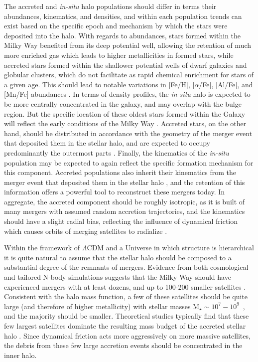 The accreted and \textit{in-situ} halo populations should differ in terms their abundances, kinematics, and densities, and within each population trends can exist based on the specific epoch and mechanism by which the stars were deposited into the halo. With regards to abundances, stars formed within the Milky Way benefited from its deep potential well, allowing the retention of much more enriched gas which leads to higher metallicities in formed stars, while accreted stars formed within the shallower potential wells of dwarf galaxies and globular clusters, which do not facilitate as rapid chemical enrichment for stars of a given age. This should lead to notable variations in [Fe/H], [$\alpha$/Fe], [Al/Fe], and [Mn/Fe] abundances \parencite{tumlinson10,zolotov10,hawkins15}. In terms of density profiles, the \textit{in-situ} halo is expected to be more centrally concentrated in the galaxy, and may overlap with the bulge region. But the specific location of these oldest stars formed within the Galaxy will reflect the early conditions of the Milky Way \parencite[e.g.][]{el-badry18}. Accreted stars, on the other hand, should be distributed in accordance with the geometry of the merger event that deposited them in the stellar halo, and are expected to occupy predominantly the outermost parts \parencite{abadi06}. Finally, the kinematics of the \textit{in-situ} population may be expected to again reflect the specific formation mechanism for this component. Accreted populations also inherit their kinematics from the merger event that deposited them in the stellar halo \parencite{bullock05,johnston08,cooper10}, and the retention of this information offers a powerful tool to reconstruct these mergers today. In aggregate, the accreted component should be roughly isotropic, as it is built of many mergers with assumed random accretion trajectories, and the kinematics should have a slight radial bias, reflecting the influence of dynamical friction which causes orbits of merging satellites to radialize \parencite{amorisco17}.

Within the framework of $\Lambda$CDM and a Universe in which structure is hierarchical it is quite natural to assume that the stellar halo should be composed to a substantial degree of the remnants of mergers. Evidence from both cosmological and tailored N-body simulations suggests that the Milky Way should have experienced mergers with at least dozens, and up to 100-200 smaller satellites \parencite{abadi06,fakhouri10,font11,pillepich14}. Consistent with the halo mass function, a few of these satellites should be quite large (and therefore of higher metallicity) with stellar masses M$_{\star} \sim 10^{7}-10^{9}$~\Msun, and the majority should be smaller. Theoretical studies typically find that these few largest satellites dominate the resulting mass budget of the accreted stellar halo \parencite{bullock05,delucia08,cooper10}. Since dynamical friction acts more aggressively on more massive satellites, the debris from these few large accretion events should be concentrated in the inner halo.

